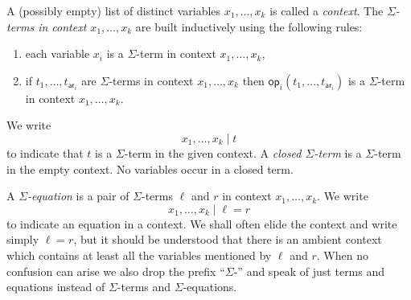 \documentclass{amsart}
\newcommand{\op}[1]{\mathsf{op}_{#1}} %
\newcommand{\arity}[1]{\mathsf{ar}_{#1}} %
\begin{document}
A (possibly empty) list of distinct variables $x_1, \ldots, x_k$ is called a
\emph{context}. The \emph{$\Sigma$-terms in context $x_1, \ldots, x_k$} are
built inductively using the following rules:
% 
\begin{enumerate}
\item each variable $x_i$ is a $\Sigma$-term in context $x_1, \ldots, x_k$,
\item if $t_1, \ldots, t_{\arity{i}}$ are $\Sigma$-terms in context $x_1, \ldots, x_k$ then
  $\op{i}(t_1, \ldots, t_{\arity{i}})$ is a $\Sigma$-term in context $x_1, \ldots, x_k$.
\end{enumerate}
%
We write
%
\begin{equation*}
  x_1, \ldots, x_k \mid t
\end{equation*}
%
to indicate that $t$ is a $\Sigma$-term in the given context. A \emph{closed
  $\Sigma$-term} is a $\Sigma$-term in the empty context. No variables occur
in a closed term.

A \emph{$\Sigma$-equation} is a pair of $\Sigma$-terms $\ell$ and $r$ in context
$x_1, \ldots, x_k$. We write
%
\begin{equation*}
  x_1, \ldots, x_k \mid \ell = r
\end{equation*}
%
to indicate an equation in a context. We shall often elide the context and write simply
$\ell = r$, but it should be understood that there is an ambient context which contains at
least all the variables mentioned by $\ell$ and $r$. When no confusion can arise we also
drop the prefix ``$\Sigma$-'' and speak of just terms and equations instead of
$\Sigma$-terms and $\Sigma$-equations.
\end{document}
